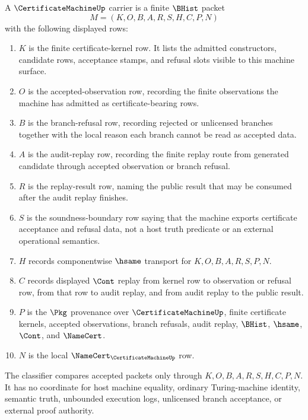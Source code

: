 \begin{definition}
\label{def:certificate-machine-carrier}
A $\CertificateMachineUp$ carrier is a finite $\BHist$ packet
$$
M=(K,O,B,A,R,S,H,C,P,N)
$$
with the following displayed rows:
\begin{enumerate}
\item $K$ is the finite certificate-kernel row. It lists the admitted constructors, candidate rows, acceptance stamps, and refusal slots visible to this machine surface.
\item $O$ is the accepted-observation row, recording the finite observations the machine has admitted as certificate-bearing rows.
\item $B$ is the branch-refusal row, recording rejected or unlicensed branches together with the local reason each branch cannot be read as accepted data.
\item $A$ is the audit-replay row, recording the finite replay route from generated candidate through accepted observation or branch refusal.
\item $R$ is the replay-result row, naming the public result that may be consumed after the audit replay finishes.
\item $S$ is the soundness-boundary row saying that the machine exports certificate acceptance and refusal data, not a host truth predicate or an external operational semantics.
\item $H$ records componentwise $\hsame$ transport for $K,O,B,A,R,S,P,N$.
\item $C$ records displayed $\Cont$ replay from kernel row to observation or refusal row, from that row to audit replay, and from audit replay to the public result.
\item $P$ is the $\Pkg$ provenance over $\CertificateMachineUp$, finite certificate kernels, accepted observations, branch refusals, audit replay, $\BHist$, $\hsame$, $\Cont$, and $\NameCert$.
\item $N$ is the local $\NameCert_{\CertificateMachineUp}$ row.
\end{enumerate}
The classifier compares accepted packets only through $K,O,B,A,R,S,H,C,P,N$. It has no coordinate for host machine equality, ordinary Turing-machine identity, semantic truth, unbounded execution logs, unlicensed branch acceptance, or external proof authority.
\end{definition}

